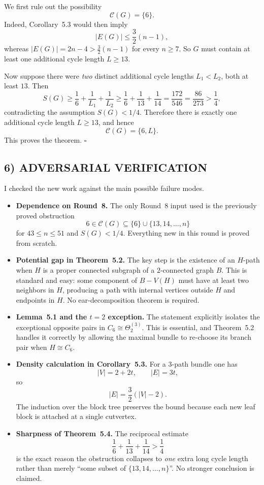 We first rule out the possibility
\[
\mathcal C(G)=\{6\}.
\]
Indeed, Corollary~5.3 would then imply
\[
|E(G)|\le \frac32(n-1),
\]
whereas $|E(G)|=2n-4>\frac32(n-1)$ for every $n\ge 7$.
So $G$ must contain at least one additional cycle length $L\ge 13$.

Now suppose there were \emph{two} distinct additional cycle lengths $L_1<L_2$, both at least $13$.
Then
\[
S(G)\ge \frac16+\frac1{L_1}+\frac1{L_2}
\ge \frac16+\frac1{13}+\frac1{14}
=\frac{172}{546}=\frac{86}{273} > \frac14,
\]
contradicting the assumption $S(G)<1/4$.
Therefore there is exactly one additional cycle length $L\ge 13$, and hence
\[
\mathcal C(G)=\{6,L\}.
\]
This proves the theorem. \hfill$\square$

\subsection*{6) ADVERSARIAL VERIFICATION}

I checked the new work against the main possible failure modes.

\begin{itemize}
\item \textbf{Dependence on Round~8.}
The only Round~8 input used is the previously proved obstruction
\[
6\in \mathcal C(G)\subseteq \{6\}\cup\{13,14,\dots,n\}
\]
for $43\le n\le 51$ and $S(G)<1/4$.
Everything new in this round is proved from scratch.

\item \textbf{Potential gap in Theorem~5.2.}
The key step is the existence of an $H$-path when $H$ is a proper connected subgraph of a $2$-connected graph $B$.
This is standard and easy: some component of $B-V(H)$ must have at least two neighbors in $H$, producing a path with internal vertices outside $H$ and endpoints in $H$.
No ear-decomposition theorem is required.

\item \textbf{Lemma~5.1 and the $t=2$ exception.}
The statement explicitly isolates the exceptional opposite pairs in $C_6\cong \Theta_2^{(3)}$.
This is essential, and Theorem~5.2 handles it correctly by allowing the maximal bundle to re-choose its branch pair when $H\cong C_6$.

\item \textbf{Density calculation in Corollary~5.3.}
For a $3$-path bundle one has
\[
|V|=2+2t,
\qquad
|E|=3t,
\]
so
\[
|E|=\frac32(|V|-2).
\]
The induction over the block tree preserves the bound because each new leaf block is attached at a single cutvertex.

\item \textbf{Sharpness of Theorem~5.4.}
The reciprocal estimate
\[
\frac16+\frac1{13}+\frac1{14}>\frac14
\]
is the exact reason the obstruction collapses to \emph{one} extra long cycle length rather than merely ``some subset of $\{13,14,\dots,n\}$''.
No stronger conclusion is claimed.
\end{itemize}


